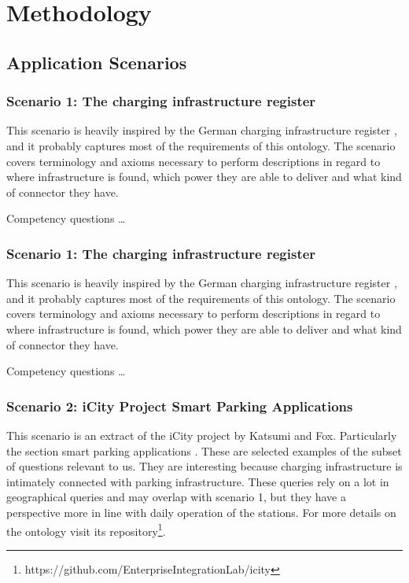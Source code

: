 ﻿\section{Methodology}
\label{methodology}

\subsection{Application Scenarios}

\subsubsection*{Scenario 1: The charging infrastructure register}

This scenario is heavily inspired by the German charging infrastructure
register \cite{Bundesnetzagentur.27Oct2023}, and it probably captures most of
the requirements of this ontology. The scenario covers terminology and axioms
necessary to perform descriptions in regard to where infrastructure is found,
which power they are able to deliver and what kind of connector they have.

Competency questions \dots

\subsubsection*{Scenario 1: The charging infrastructure register}

This scenario is heavily inspired by the German charging infrastructure
register \cite{Bundesnetzagentur.27Oct2023}, and it probably captures most of
the requirements of this ontology. The scenario covers terminology and axioms
necessary to perform descriptions in regard to where infrastructure is found,
which power they are able to deliver and what kind of connector they have.

Competency questions \dots

\subsubsection*{Scenario 2: iCity Project Smart Parking Applications}

This scenario is an extract of the iCity project by Katsumi and Fox.
Particularly the section smart parking applications \cite{Katsumi.2020}. These
are selected examples of the subset of questions relevant to us. They are
interesting because charging infrastructure is intimately connected with
parking infrastructure. These queries rely on a lot in geographical queries and
may overlap with scenario 1, but they have a perspective more in line with
daily operation of the stations. For more details on the ontology visit its
repository\footnote{https://github.com/EnterpriseIntegrationLab/icity}.


